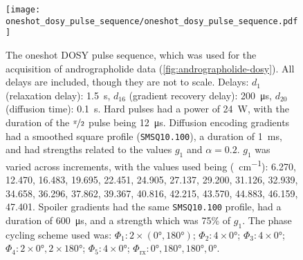\begin{figure}[H]
    \centering
    \texttt{[image: oneshot\_dosy\_pulse\_sequence/oneshot\_dosy\_pulse\_sequence.pdf]}
    \caption[
        The oneshot \acs{DOSY} pulse sequence, which was used for the
        acquisition of the andrographolide data in \cref{fig:andrographolide-dosy}.
    ]{
        The oneshot \ac{DOSY} pulse sequence, which was used for the acquisition
        of andrographolide data (\cref{fig:andrographolide-dosy}). All
        delays are included, though they are not to scale.
        Delays:
        $d_1$ (relaxation delay): \qty{1.5}{\second},
        $d_{16}$ (gradient recovery delay): \qty{200}{\micro\second},
        $d_{20}$ (diffusion time): \qty{0.1}{\second}.
        Hard pulses had a power of \qty{24}{\watt},
        with the duration of the $\nicefrac{\pi}{2}$ pulse being
        \qty{12}{\micro\second}.
        Diffusion encoding gradients had a smoothed square profile
        (\texttt{SMSQ10.100}), a duration of \qty{1}{\milli\second}, and had
        strengths related to the values $g_1$ and $\alpha = 0.2$.
        $g_1$ was varied across increments, with the values used
        being (\unit{\gauss \per \centi \meter}):
        6.270,
        12.470,
        16.483,
        19.695,
        22.451,
        24.905,
        27.137,
        29.200,
        31.126,
        32.939,
        34.658,
        36.296,
        37.862,
        39.367,
        40.816,
        42.215,
        43.570,
        44.883,
        46.159,
        47.401.
        Spoiler gradients had the same \texttt{SMSQ10.100} profile, had a
        duration of \qty{600}{\micro\second}, and a strength which was 75\% of
        $g_1$.
        The phase cycling scheme used was:
        $\Phi_1: 2 \times (\ang{0}, \ang{180})$;
        $\Phi_2: 4 \times \ang{0}$;
        $\Phi_3: 4 \times \ang{0}$;
        $\Phi_4: 2 \times \ang{0}, 2 \times \ang{180}$;
        $\Phi_5: 4 \times \ang{0}$;
        $\Phi_{\text{rx}}: \ang{0}, \ang{180}, \ang{180}, \ang{0}$.
    }
    \label{fig:oneshot-dosy}


\end{figure}
